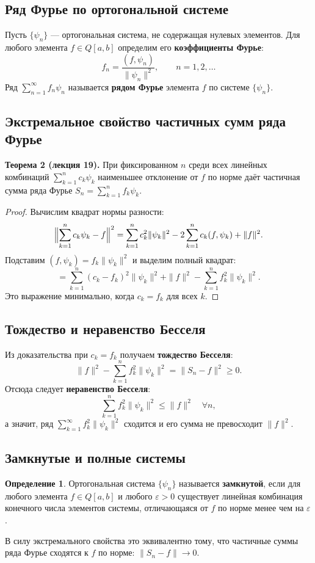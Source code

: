\documentclass{article}
\theoremstyle{definition}
\newtheorem{definition}{Определение}
\begin{document}
\subsection{Ряд Фурье по ортогональной системе}
Пусть $\{\psi_n\}$ — ортогональная система, не содержащая нулевых элементов. Для любого элемента $f\in Q[a,b]$ определим его \textbf{коэффициенты Фурье}:
\[
f_n = \frac{(f,\psi_n)}{\|\psi_n\|^2},\qquad n=1,2,\dots
\]
Ряд $\sum_{n=1}^{\infty} f_n\psi_n$ называется \textbf{рядом Фурье} элемента $f$ по системе $\{\psi_n\}$.

\subsection{Экстремальное свойство частичных сумм ряда Фурье}
\textbf{Теорема 2 (лекция 19).} При фиксированном $n$ среди всех линейных комбинаций $\sum_{k=1}^n c_k\psi_k$ наименьшее отклонение от $f$ по норме даёт частичная сумма ряда Фурье $S_n=\sum_{k=1}^n f_k\psi_k$.

\begin{proof}
Вычислим квадрат нормы разности:
\[
\Bigl\|\sum_{k=1}^n c_k\psi_k - f\Bigr\|^2 = \sum_{k=1}^n c_k^2\|\psi_k\|^2 - 2\sum_{k=1}^n c_k (f,\psi_k) + \|f\|^2.
\]
Подставим $(f,\psi_k)=f_k\|\psi_k\|^2$ и выделим полный квадрат:
\[
= \sum_{k=1}^n (c_k - f_k)^2\|\psi_k\|^2 + \|f\|^2 - \sum_{k=1}^n f_k^2\|\psi_k\|^2.
\]
Это выражение минимально, когда $c_k=f_k$ для всех $k$.
\end{proof}

\subsection{Тождество и неравенство Бесселя}
Из доказательства при $c_k=f_k$ получаем \textbf{тождество Бесселя}:
\[
\|f\|^2 - \sum_{k=1}^n f_k^2\|\psi_k\|^2 = \|S_n - f\|^2 \ge 0.
\]
Отсюда следует \textbf{неравенство Бесселя}:
\[
\sum_{k=1}^n f_k^2\|\psi_k\|^2 \le \|f\|^2 \quad \forall n,
\]
а значит, ряд $\sum_{k=1}^{\infty} f_k^2\|\psi_k\|^2$ сходится и его сумма не превосходит $\|f\|^2$.

\subsection{Замкнутые и полные системы}
\begin{definition}
Ортогональная система $\{\psi_n\}$ называется \textbf{замкнутой}, если для любого элемента $f\in Q[a,b]$ и любого $\varepsilon>0$ существует линейная комбинация конечного числа элементов системы, отличающаяся от $f$ по норме менее чем на $\varepsilon$.
\end{definition}
В силу экстремального свойства это эквивалентно тому, что частичные суммы ряда Фурье сходятся к $f$ по норме: $\|S_n - f\|\to0$.
\end{document}
